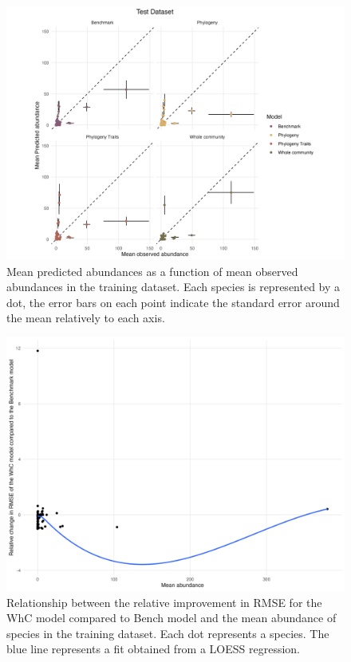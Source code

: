 \begin{figure}
\hypertarget{fig:chapt1supp19}{%
\centering
\includegraphics{03-Chapitre1/figures/supplementary/fig_supp19.png}
\caption{Mean predicted abundances as a function of mean observed
abundances in the training dataset. Each species is represented by a
dot, the error bars on each point indicate the standard error around the
mean relatively to each axis.}\label{fig:chapt1supp19}
}
\end{figure}

\begin{figure}
\hypertarget{fig:chapt1supp20}{%
\centering
\includegraphics{03-Chapitre1/figures/supplementary/fig_supp20.png}
\caption{Relationship between the relative improvement in RMSE for the
WhC model compared to Bench model and the mean abundance of species in
the training dataset. Each dot represents a species. The blue line
represents a fit obtained from a LOESS
regression.}\label{fig:chapt1supp20}
}
\end{figure}

